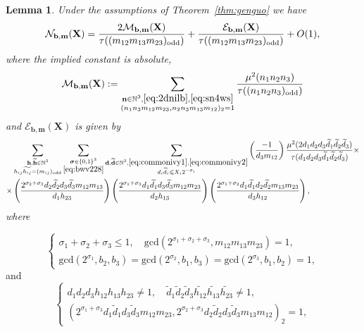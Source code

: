 \documentclass[a4paper,12pt,reqno]{amsart}
\numberwithin{equation}{section} \numberwithin{figure}{section}
\newcommand\N{\mathbb{N}}
\renewcommand{\l}{\left}
\renewcommand{\r}{\right}
\renewcommand{\b}{\mathbf}
\renewcommand{\c}{\mathcal}
\renewcommand{\gcd}{\textrm{gcd}}
\renewcommand{\leq}{\leqslant}
\renewcommand{\#}{\sharp}
\newtheorem{lemma}{Lemma}
\theoremstyle{definition}
\numberwithin{lemma}{section}
\begin{document}
  
\begin{lemma}\label{lem:detectlem4}  Under the assumptions of Theorem~\ref{thm:genguo} we have 
  $$\c N_{\b b , \b m }(\b X)=\frac{2\c M_{\b b , \b m }(\b X)}{\tau(( m_{12}    m_{13} m_{23})_{\rm{odd}})} 
+\frac{\c E_{\b b , \b m }(\b X)}{\tau(( m_{12}    m_{13} m_{23})_{\rm{odd}})} 
+O(1),$$
where the implied constant is absolute, 
\[\c M_{\b b , \b m }(\b X) :=\sum_{\substack{\b n \in \N^3, \eqref{eq:2dnilb}, \eqref{eq:sn4ws}  \\
(n_1   n_3   m_{12}  m_{23}  ,n_2    n_3  m_{13} m_{12} )_2 =1}} 
 \frac{\mu^2(n_1n_2n_3)}{\tau((n_1n_2n_3 )_{\rm{odd}})} 
\]and    $ \c E_{\b b , \b m }(\b X)$ is given by 
\begin{align*}
  &
\sum_{\substack{ \b h, \widetilde{\b h }\in \N^3 \\ h_{ij}\widetilde{ h_{ij} }=(m_{ij})_{\rm{odd}}  }}  
 \sum_{\substack{ \boldsymbol \sigma \in \{0,1\}^3
 \\ \eqref{eq:bwv228}
} }
 \sum_{\substack{ \b d   , \widetilde{\b d } \in \N^3, \eqref{eq:commonivy1},\eqref{eq:commonivy2}
\\
d_i \widetilde d_i \leq X_i 2^{-\sigma_i} 
 } }  \l(\frac{-1}{d_3m_{12} }\r) 
  \frac{\mu^2(2 d_1d_2d_3 \widetilde d_1  \widetilde d_2  \widetilde d_3 ) }{\tau(  d_1d_2d_3 \widetilde d_1  \widetilde d_2  \widetilde d_3 )}
\times 
\\
\times 
& 
  \l(\frac{
2^{\sigma_2+\sigma_3}  
d_2 \widetilde {d_2} d_3 \widetilde {d_3}m_{12}m_{13}}{d_1 h_{23}}\r)
 \l(\frac{2^{\sigma_1+\sigma_3}   d_1 \widetilde {d_1} d_3 \widetilde {d_3}m_{12}m_{23}}{d_2 h_{13}}\r)
 \l(\frac{2^{\sigma_1+\sigma_2}   d_1 \widetilde {d_1} d_2 \widetilde {d_2}m_{13}m_{23}}{d_3 h_{12}}\r)
,\end{align*} where  
\end{lemma}
 \begin{equation}\label{eq:bwv228}
\begin{cases}  
\sigma_1+\sigma_2+\sigma_3\leq 1, \quad \gcd(2^{\sigma_1+\sigma_2+\sigma_3}  ,m_{12}m_{13}m_{23} )=1,
\\
\gcd(2^{\sigma_1}   ,b_2,b_3)=\gcd(2^{\sigma_2}   ,b_1,b_3)=\gcd(2^{\sigma_3}   ,b_1,b_2)=1,
 \end{cases} \end{equation} 
and
\begin{equation}\label{eq:commonivy1}
\begin{cases}     
d_1 d_2 d_3  h_{12}h_{13}h_{23} \neq 1, \quad \widetilde d_1  \widetilde d_2 \widetilde d_3
\widetilde {h_{12}}\widetilde {h_{13}}\widetilde {h_{23}} \neq 1,
\\(2^{\sigma_1+\sigma_3}  d_1 \widetilde d_1d_3 \widetilde d_3  m_{12}  m_{23}  ,2^{\sigma_2+\sigma_3}
d_2 \widetilde d_2 d_3 \widetilde d_3  m_{13} m_{12} )_2 =1,
\end{cases} \end{equation} 
\end{document}

